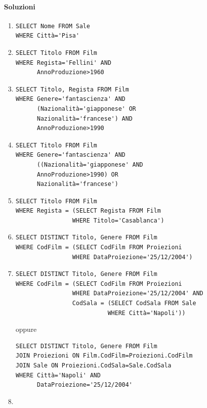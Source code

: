 \documentclass[a4paper]{article}
\begin{document}
\begin{enumerate}[leftmargin=*]
\paragraph{Soluzioni}
\begin{enumerate}
\item
\begin{verbatim}
SELECT Nome FROM Sale
WHERE Città='Pisa'
\end{verbatim}
\item
\begin{verbatim}
SELECT Titolo FROM Film
WHERE Regista='Fellini' AND
      AnnoProduzione>1960
\end{verbatim}
\item
\begin{verbatim}
SELECT Titolo, Regista FROM Film
WHERE Genere='fantascienza' AND
      (Nazionalità='giapponese' OR
      Nazionalità='francese') AND
      AnnoProduzione>1990
\end{verbatim}
\item
\begin{verbatim}
SELECT Titolo FROM Film
WHERE Genere='fantascienza' AND
      ((Nazionalità='giapponese' AND
      AnnoProduzione>1990) OR
      Nazionalità='francese')
\end{verbatim}
\item
\begin{verbatim}
SELECT Titolo FROM Film
WHERE Regista = (SELECT Regista FROM Film
                WHERE Titolo='Casablanca')
\end{verbatim}
\item
\begin{verbatim}
SELECT DISTINCT Titolo, Genere FROM Film
WHERE CodFilm = (SELECT CodFilm FROM Proiezioni
                WHERE DataProiezione='25/12/2004')
\end{verbatim}
\item
\begin{verbatim}
SELECT DISTINCT Titolo, Genere FROM Film
WHERE CodFilm = (SELECT CodFilm FROM Proiezioni
                WHERE DataProiezione='25/12/2004' AND
                CodSala = (SELECT CodSala FROM Sale
                          WHERE Città='Napoli'))
\end{verbatim}
oppure
\begin{verbatim}
SELECT DISTINCT Titolo, Genere FROM Film
JOIN Proiezioni ON Film.CodFilm=Proiezioni.CodFilm
JOIN Sale ON Proiezioni.CodSala=Sale.CodSala
WHERE Città='Napoli' AND
      DataProiezione='25/12/2004'
\end{verbatim}
\item

\end{enumerate}
\end{enumerate}
\end{document}
